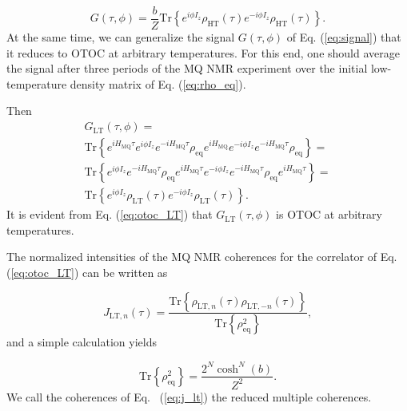 \documentclass[%
 reprint,
superscriptaddress,
 amsmath,amssymb,
]{revtex4-2}
\begin{document}
\begin{equation}
    \label{eq:otoc_HT}
    G(\tau, \phi) = \frac b Z\mathrm{Tr}\left\{ 
    e^{i \phi I_z} 
    \rho_\mathrm{HT} (\tau) 
    e^{-i \phi I_z} 
    \rho_\mathrm{HT}(\tau) 
    \right\}.
\end{equation}
At the same time, we can generalize the signal $G(\tau, \phi)$ of Eq. (\ref{eq:signal}) that it reduces to OTOC at arbitrary temperatures. For this end, one should average the signal after three periods of the MQ NMR experiment \cite{mq_nmr_experiment} over the initial low-temperature density matrix of Eq. (\ref{eq:rho_eq}).

Then 
\begin{multline}
    \label{eq:otoc_LT}
    G_\mathrm{LT}(\tau, \phi) = \\
  \mathrm{Tr}\left\{ 
        e^{i H_{\mathrm{MQ}} \tau} 
        e^{i \phi I_z} 
        e^{-i H_{\mathrm{MQ}} \tau} 
        \rho_{\mathrm{eq}}
        e^{i H_{\mathrm{MQ}}}
        e^{-i \phi I_z} 
        e^{-i H_{\mathrm{MQ}} \tau} 
        \rho_{\mathrm{eq}}
     \right\} = \\
   \mathrm{Tr}\left\{
         e^{i \phi I_z} 
         e^{-i H_\mathrm{MQ} \tau} 
         \rho_\mathrm{eq} 
         e^{i H_\mathrm{MQ} \tau} 
         e^{-i \phi I_z} 
         e^{-i H_\mathrm{MQ} \tau} 
         \rho_{\mathrm{eq}}
         e^{i H_\mathrm{MQ} \tau} 
     \right\} = \\
   \mathrm{Tr}\left\{ 
         e^{i \phi I_z} 
         \rho_\mathrm{LT} (\tau) 
         e^{-i \phi I_z} 
         \rho_\mathrm{LT} (\tau) 
     \right\}.
\end{multline}
It is evident from Eq. (\ref{eq:otoc_LT}) that $G_\mathrm{LT}(\tau, \phi)$ is OTOC at arbitrary temperatures.

The normalized intensities of the MQ NMR coherences for the correlator of Eq. (\ref{eq:otoc_LT}) can be written as 

\begin{equation}
    \label{eq:j_lt}
    J_{\mathrm{LT}, n}(\tau) = 
    \frac{\mathrm{Tr} \left\{ 
        \rho_{\mathrm{LT},n}(\tau)
        \rho_{\mathrm{LT}, -n}(\tau)
    \right\}}
    {\mathrm{Tr}\left\{\rho^2_\mathrm{eq}\right\}},             
\end{equation}
and a simple calculation yields

\begin{equation}
    \label{eq:j_lt_norm}
  \mathrm{Tr}\left\{\rho^2_\mathrm{eq}\right\} = 
    \frac{2^N \cosh^N(b)}{Z^2}.
\end{equation}
We call the coherences of Eq. ~(\ref{eq:j_lt}) the reduced multiple coherences.
\end{document}
